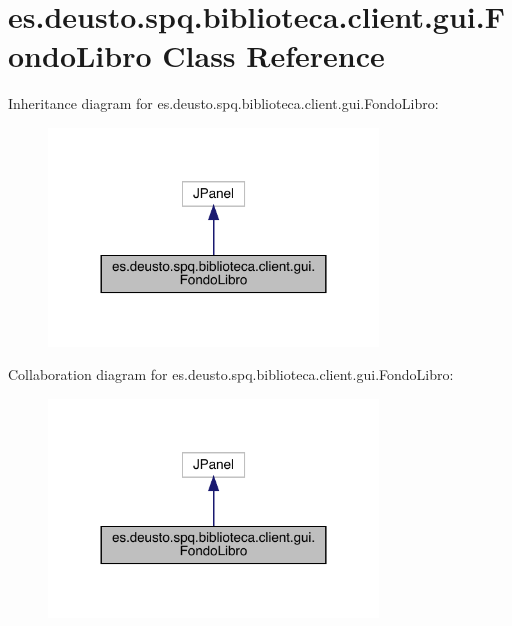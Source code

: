 \hypertarget{classes_1_1deusto_1_1spq_1_1biblioteca_1_1client_1_1gui_1_1_fondo_libro}{}\section{es.\+deusto.\+spq.\+biblioteca.\+client.\+gui.\+Fondo\+Libro Class Reference}
\label{classes_1_1deusto_1_1spq_1_1biblioteca_1_1client_1_1gui_1_1_fondo_libro}


Inheritance diagram for es.\+deusto.\+spq.\+biblioteca.\+client.\+gui.\+Fondo\+Libro\+:
\nopagebreak
\begin{figure}[H]
\begin{center}
\leavevmode
\includegraphics[width=248pt]{classes_1_1deusto_1_1spq_1_1biblioteca_1_1client_1_1gui_1_1_fondo_libro__inherit__graph}
\end{center}
\end{figure}


Collaboration diagram for es.\+deusto.\+spq.\+biblioteca.\+client.\+gui.\+Fondo\+Libro\+:
\nopagebreak
\begin{figure}[H]
\begin{center}
\leavevmode
\includegraphics[width=248pt]{classes_1_1deusto_1_1spq_1_1biblioteca_1_1client_1_1gui_1_1_fondo_libro__coll__graph}
\end{center}
\end{figure}
